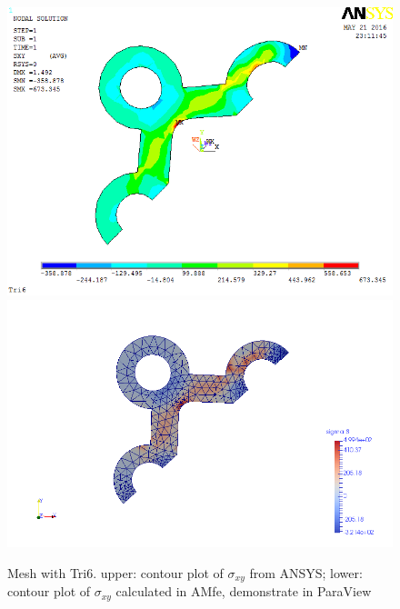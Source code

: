 \begin{figure}[htbp]
	\begin{center}
		\includegraphics[width=13cm,clip]{Tri6_Sxy.png} 		
		\includegraphics[width=13cm,clip]{Tri6_Sxy_P.png} 		
		\caption{Mesh with Tri6. upper: contour plot of $\sigma_{xy}$ from ANSYS; lower: contour plot of $\sigma_{xy}$ calculated in AMfe, demonstrate in ParaView} \label{fig: Tri6_Sxy}
	\end{center}
\end{figure}
\clearpage 



